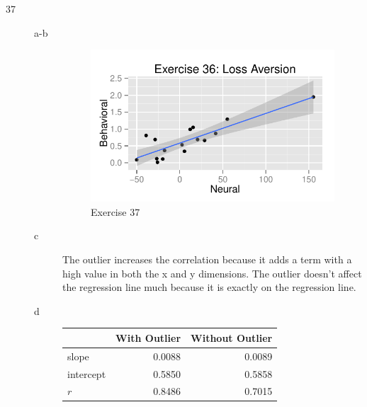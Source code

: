 \documentclass[letterpaper]{exam}
\begin{document}
\begin{description}

      \item[37]
        \begin{description}
          \item[a-b]
            \begin{figure}[H]
              \centering
              \includegraphics{figures/ex37.pdf}
              \caption{Exercise 37}
            \end{figure}

          \item[c]
            The outlier increases the correlation because it adds a term
            with a high value in both the x and y dimensions.  The outlier
            doesn't affect the regression line much because it is exactly on the
            regression line.

          \item[d]
            \begin{tabular}[H]{lrr}
              \toprule
                        & With Outlier & Without Outlier \\
              \midrule
              slope     & 0.0088       & 0.0089 \\
              intercept & 0.5850       & 0.5858 \\
              $r$       & 0.8486       & 0.7015 \\
              \bottomrule
            \end{tabular}
        \end{description}


\end{description}
\end{document}
